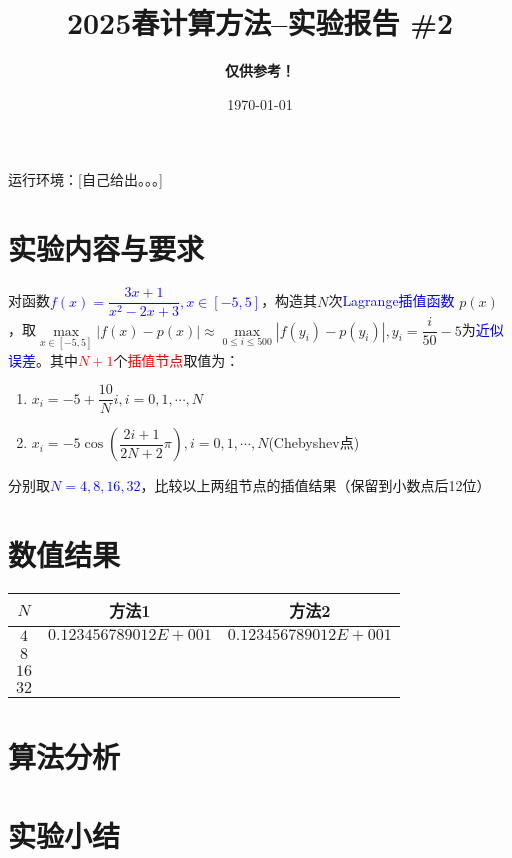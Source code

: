 \documentclass[UTF8]{ctexart}
\title{\textbf {2025春计算方法--实验报告 \#2}}
\author{\textbf{\color{red}仅供参考！}}
\date{\today}
\begin{document}
\maketitle

运行环境：[自己给出。。。]

\section*{实验内容与要求}

    对函数\textcolor{blue}{$f(x)=\dfrac{3x+1}{x^2-2x+3},x\in[-5,5]$}，构造其$N$次\textcolor{blue}{Lagrange插值函数} $p(x)$，取$\max\limits_{x\in[-5,5]}|f(x)-p(x)|\approx\max\limits_{0\leq i\leq 500}|f(y_i)-p(y_i)|,y_i=\dfrac{i}{50}-5$为\textcolor{blue}{近似误差}。其中\textcolor{red}{$N+1$}个\textcolor{red}{插值节点}取值为：

    \begin{enumerate}
        \item $x_i=-5+\dfrac{10}{N}i,i=0,1,\cdots,N$
        \item $x_i=-5\cos\left(\dfrac{2i+1}{2N+2}\pi\right),i=0,1,\cdots,N$(Chebyshev点)
    \end{enumerate}

    分别取\textcolor{blue}{$N=4,8,16,32$}，比较以上两组节点的插值结果（保留到小数点后12位）


\section{数值结果}


    \begin{table}[H]
    \begin{center}
    \begin{tabular}{|c|c|c|}
    \hline
    $N$ & 方法1 & 方法2 \\
    \hline
    $4$ & $0.123456789012E+001$ & $0.123456789012E+001$ \\
    \hline
    $8$ &  &  \\
    \hline
    $16$ &  &  \\
    \hline
    $32$ &  &  \\
    \hline
    \end{tabular}
    \end{center}
    \end{table}


\section{算法分析}


\section{实验小结}
\end{document}
